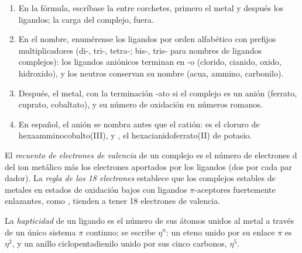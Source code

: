 \begin{method}\label{met:b2:coordination-complexes:naming}
\begin{enumerate}
  \item En la fórmula, escríbase la  entre corchetes, primero el
        metal y después los ligandos; la carga del complejo, fuera.
  \item En el nombre, enumérense los ligandos por orden alfabético con prefijos
        multiplicadores (di-, tri-, tetra-; bis-, tris- para nombres de ligandos complejos): los ligandos
        aniónicos terminan en -o (clorido, cianido, oxido, hidroxido), y los neutros conservan
        su nombre (acua, ammino, carbonilo).
  \item Después, el metal, con la terminación -ato si el complejo es un anión (ferrato,
        cuprato, cobaltato), y su número de oxidación en números romanos.
  \item En español, el anión se nombra antes que el catión:  es
        el cloruro de hexaamminocobalto(III), y , el
        hexacianidoferrato(II) de potasio.
\end{enumerate}
\end{method}

\begin{definition}\label{def:b2:coordination-complexes:electron-count}
El \emph{recuento de electrones de valencia} de un complejo es el
número de electrones d del ion metálico más los electrones aportados por los ligandos (dos
por cada par dador). La \emph{regla de los 18 electrones} establece que
los complejos estables de metales en estados de oxidación bajos con ligandos $\pi$-aceptores fuertemente
enlazantes, como , tienden a tener 18 electrones de valencia.
\end{definition}

\begin{definition}[Hapticidad]\label{def:b2:coordination-complexes:hapticity}
La \emph{hapticidad} de un ligando es el número de sus átomos unidos al
metal a través de un único sistema $\pi$ continuo; se escribe $\eta^n$: un eteno unido por
su enlace $\pi$ es $\eta^2$, y un anillo ciclopentadienilo unido por sus cinco carbonos, $\eta^5$.
\end{definition}

